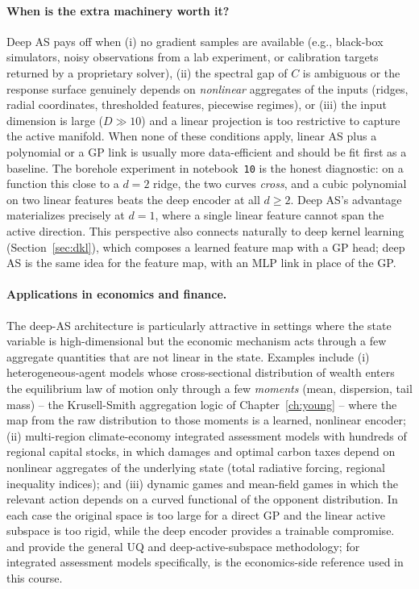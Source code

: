 \documentclass[11pt,a4paper]{report}
\begin{document}
\paragraph{When is the extra machinery worth it?}
Deep AS pays off when (i) no gradient samples are available (e.g., black-box simulators, noisy observations from a lab experiment, or calibration targets returned by a proprietary solver), (ii) the spectral gap of $C$ is ambiguous or the response surface genuinely depends on \emph{nonlinear} aggregates of the inputs (ridges, radial coordinates, thresholded features, piecewise regimes), or (iii) the input dimension is large ($D \gg 10$) and a linear projection is too restrictive to capture the active manifold.  When none of these conditions apply, linear AS plus a polynomial or a GP link is usually more data-efficient and should be fit first as a baseline.  The borehole experiment in notebook~\texttt{10} is the honest diagnostic: on a function this close to a $d = 2$ ridge, the two curves \emph{cross}, and a cubic polynomial on two linear features beats the deep encoder at all $d \ge 2$.  Deep AS's advantage materializes precisely at $d = 1$, where a single linear feature cannot span the active direction.  This perspective also connects naturally to deep kernel learning (Section~\ref{sec:dkl}), which composes a learned feature map with a GP head; deep AS is the same idea for the feature map, with an MLP link in place of the GP.

\paragraph{Applications in economics and finance.}
The deep-AS architecture is particularly attractive in settings where the state variable is high-dimensional but the economic mechanism acts through a few aggregate quantities that are not linear in the state.  Examples include (i) heterogeneous-agent models whose cross-sectional distribution of wealth enters the equilibrium law of motion only through a few \emph{moments} (mean, dispersion, tail mass) -- the Krusell-Smith aggregation logic of Chapter~\ref{ch:young} -- where the map from the raw distribution to those moments is a learned, nonlinear encoder; (ii) multi-region climate-economy integrated assessment models with hundreds of regional capital stocks, in which damages and optimal carbon taxes depend on nonlinear aggregates of the underlying state (total radiative forcing, regional inequality indices); and (iii) dynamic games and mean-field games in which the relevant action depends on a curved functional of the opponent distribution.  In each case the original space is too large for a direct GP and the linear active subspace is too rigid, while the deep encoder provides a trainable compromise.  \citet{Bilionis:2016wc} and \citet{tripathy2018deep} provide the general UQ and deep-active-subspace methodology; for integrated assessment models specifically, \citet{friedlDeep2023} is the economics-side reference used in this course.
\end{document}
